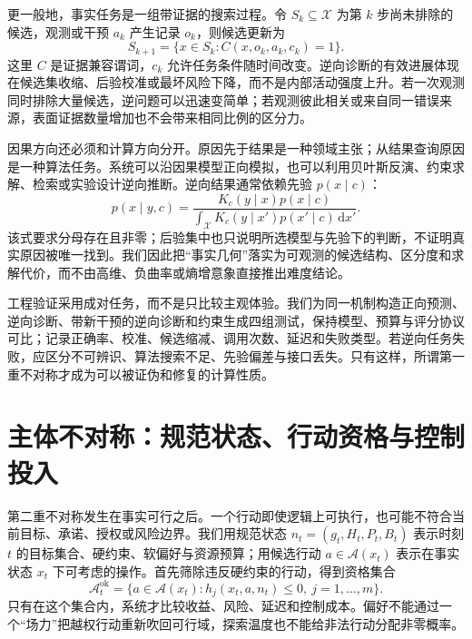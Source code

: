 更一般地，事实任务是一组带证据的搜索过程。令 $S_k\subseteq\mathcal{X}$ 为第 $k$ 步尚未排除的候选，观测或干预 $a_k$ 产生记录 $o_k$，则候选更新为
\begin{equation}
S_{k+1}=\{x\in S_k:C(x,o_k,a_k,c_k)=1\}.
\end{equation}
这里 $C$ 是证据兼容谓词，$c_k$ 允许任务条件随时间改变。逆向诊断的有效进展体现在候选集收缩、后验校准或最坏风险下降，而不是内部活动强度上升。若一次观测同时排除大量候选，逆问题可以迅速变简单；若观测彼此相关或来自同一错误来源，表面证据数量增加也不会带来相同比例的区分力。

因果方向还必须和计算方向分开。原因先于结果是一种领域主张；从结果查询原因是一种算法任务。系统可以沿因果模型正向模拟，也可以利用贝叶斯反演、约束求解、检索或实验设计逆向推断。逆向结果通常依赖先验 $p(x\mid c)$：
\begin{equation}
p(x\mid y,c)=\frac{K_c(y\mid x)p(x\mid c)}{\int_{\mathcal{X}}K_c(y\mid x')p(x'\mid c)\,\mathrm{d}x'}.
\end{equation}
该式要求分母存在且非零；后验集中也只说明所选模型与先验下的判断，不证明真实原因被唯一找到。我们因此把“事实几何”落实为可观测的候选结构、区分度和求解代价，而不由高维、负曲率或熵增意象直接推出难度结论。

工程验证采用成对任务，而不是只比较主观体验。我们为同一机制构造正向预测、逆向诊断、带新干预的逆向诊断和约束生成四组测试，保持模型、预算与评分协议可比；记录正确率、校准、候选缩减、调用次数、延迟和失败类型。若逆向任务失败，应区分不可辨识、算法搜索不足、先验偏差与接口丢失。只有这样，所谓第一重不对称才成为可以被证伪和修复的计算性质。

\section{主体不对称：规范状态、行动资格与控制投入}
\label{sec:subjective_asymmetry}

第二重不对称发生在事实可行之后。一个行动即使逻辑上可执行，也可能不符合当前目标、承诺、授权或风险边界。我们用规范状态 $n_t=(g_t,H_t,P_t,B_t)$ 表示时刻 $t$ 的目标集合、硬约束、软偏好与资源预算；用候选行动 $a\in\mathcal{A}(x_t)$ 表示在事实状态 $x_t$ 下可考虑的操作。首先筛除违反硬约束的行动，得到资格集合
\begin{equation}
\mathcal{A}^{\mathrm{ok}}_t=\{a\in\mathcal{A}(x_t):h_j(x_t,a,n_t)\leq 0,\ j=1,\ldots,m\}.
\end{equation}
只有在这个集合内，系统才比较收益、风险、延迟和控制成本。偏好不能通过一个“场力”把越权行动重新吹回可行域，探索温度也不能给非法行动分配非零概率。

